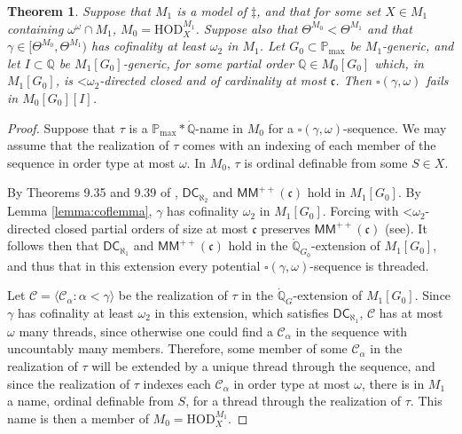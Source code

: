 \documentclass[12pt]{article}
\newtheorem{theorem}{Theorem}[section]
\newcommand{\pmax}{\mathbb{P}_{\mathrm{max}}}
\newcommand{\bbQ}{\mathbb{Q}}
\newcommand{\breals}{\omega^{\omega}}
\newcommand{\HOD}{\mathrm{HOD}}
\newcommand{\DC}{\mathsf{DC}}
\newcommand{\MM}{\mathsf{MM}}
\newcommand{\less}{\mathord{<}}
\begin{document}
\begin{theorem} \label{theorem:vanilla}
Suppose that $M_{1}$ is a model of $\ddagger$, and that for some set $X \in M_{1}$ containing
$\breals \cap M_{1}$, $M_{0} = \HOD^{M_{1}}_{X}$. Suppose also that  $\Theta^{M_{0}} < \Theta^{M_{1}}$ and that $\gamma \in [\Theta^{M_{0}}, \Theta^{M_{1}})$ has cofinality at least $\omega_{2}$ in $M_{1}$.
Let $G_0 \subset \pmax$ be $M_{1}$-generic, and let $I \subset \bbQ$ be
$M_{1}[G_0]$-generic, for some partial order $\bbQ \in M_{0}[G_0]$ which, in $M_{1}[G_0]$, is
$\less\omega_{2}$-directed closed and of cardinality at most $\mathfrak{c}$.
Then $\square(\gamma, \omega)$ fails in $M_{0}[G_0][I]$.
\end{theorem}

\begin{proof}
Suppose that $\tau$ is a $\pmax * \dot{\bbQ}$-name in $M_{0}$ for a
$\square(\gamma,\omega)$-sequence. We may assume that the realization of $\tau$ comes with
an indexing of each member of the sequence in order type at most $\omega$. In $M_{0}$, $\tau$ is
ordinal definable from some $S \in X$.

By Theorems 9.35 and 9.39 of \cite{Woodin}, $\DC_{\aleph_{2}}$ and $\MM^{++}(\mathfrak{c})$ hold in $M_{1}[G_0]$.
By Lemma \ref{lemma:coflemma},
$\gamma$ has cofinality $\omega_{2}$ in $M_{1}[G_0]$.
Forcing with $\less\omega_{2}$-directed closed partial orders
of size at most $\mathfrak{c}$ preserves $\MM^{++}(\mathfrak{c})$ (see\cite{Larson:separating}). It follows then
that $\DC_{\aleph_{1}}$ and $\MM^{++} (\mathfrak{c})$ hold in the $\dot{\bbQ}_{G_0}$-extension of $M_{1}[G_0]$,
and thus that in this extension every potential $\square(\gamma, \omega)$-sequence is
threaded.

Let $\mathcal{C} = \langle \mathcal{C}_{\alpha} : \alpha < \gamma \rangle$ be the realization of
$\tau$ in the $\dot{\bbQ}_{G}$-extension of $M_{1}[G_0]$. Since $\gamma$ has cofinality at least $\omega_{2}$ in this
extension, which satisfies $\DC_{\aleph_{1}}$, $\mathcal{C}$ has at most $\omega$ many
threads, since otherwise one could find a $\mathcal{C}_{\alpha}$ in the sequence with uncountably
many members. Therefore, some member of some $\mathcal{C}_{\alpha}$ in the realization of $\tau$
will be extended by a unique thread through the sequence, and since the realization of $\tau$ indexes
each $\mathcal{C}_{\alpha}$ in order type at most $\omega$, there is in $M_{1}$ a name, ordinal
definable from $S$, for a thread through the realization of $\tau$. This name is then a member of
$M_{0} = \HOD^{M_{1}}_{X}$.
\end{proof}
\end{document}
